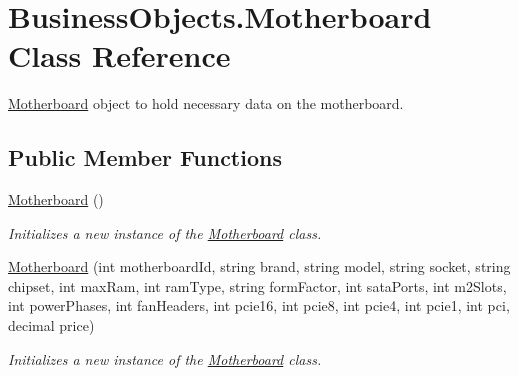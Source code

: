 \hypertarget{class_business_objects_1_1_motherboard}{}\section{Business\+Objects.\+Motherboard Class Reference}
\label{class_business_objects_1_1_motherboard}


\hyperlink{class_business_objects_1_1_motherboard}{Motherboard} object to hold necessary data on the motherboard.  


\subsection*{Public Member Functions}
\begin{DoxyCompactItemize}
\item 
\hyperlink{class_business_objects_1_1_motherboard_a91ff736d1cb114aa298e22ae44c90634}{Motherboard} ()
\begin{DoxyCompactList}\small\item\em Initializes a new instance of the \hyperlink{class_business_objects_1_1_motherboard}{Motherboard} class. \end{DoxyCompactList}\item 
\hyperlink{class_business_objects_1_1_motherboard_a21fe91580de645025fb2c84a93b75562}{Motherboard} (int motherboard\+Id, string brand, string model, string socket, string chipset, int max\+Ram, int ram\+Type, string form\+Factor, int sata\+Ports, int m2\+Slots, int power\+Phases, int fan\+Headers, int pcie16, int pcie8, int pcie4, int pcie1, int pci, decimal price)
\begin{DoxyCompactList}\small\item\em Initializes a new instance of the \hyperlink{class_business_objects_1_1_motherboard}{Motherboard} class. \end{DoxyCompactList}\end{DoxyCompactItemize}
